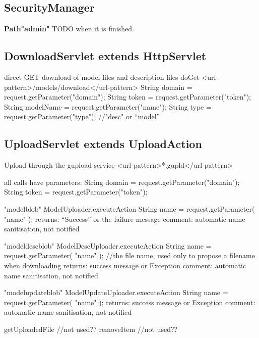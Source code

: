 \subsection{SecurityManager}
\textbf{ Path"admin"}
TODO when it is finished.

\subsection{DownloadServlet extends HttpServlet }  
direct GET download of model files and description files
doGet <url-pattern>/models/download</url-pattern>
	String domain = request.getParameter("domain");
	String token = request.getParameter("token");
	String modelName = request.getParameter("name");
	String type = request.getParameter("type");  //"desc" or ``model''
	
\subsection{UploadServlet extends UploadAction }  
Upload through the gupload service
<url-pattern>*.gupld</url-pattern>

all calls have parameters: 
	String domain = request.getParameter("domain");		
	String token = request.getParameter("token");
   
	"modelblob"
	ModelUploader.executeAction
	String name = request.getParameter( "name" );
	returns: ``Success'' or the failure message
	comment: automatic name sanitisation, not notified
	
	"modeldescblob"
	ModelDescUploader.executeAction
	String name = request.getParameter( "name" ); //the file name, used only to propose a filename when downloading
	returns: success message or Exception
	comment: automatic name sanitisation, not notified
	
	"modelupdateblob"
	ModelUpdateUploader.executeAction
	String name = request.getParameter( "name" );
	returns: success message or Exception
	comment: automatic name sanitisation, not notified
	
	getUploadedFile  //not used??
	removeItem  //not used??
	



